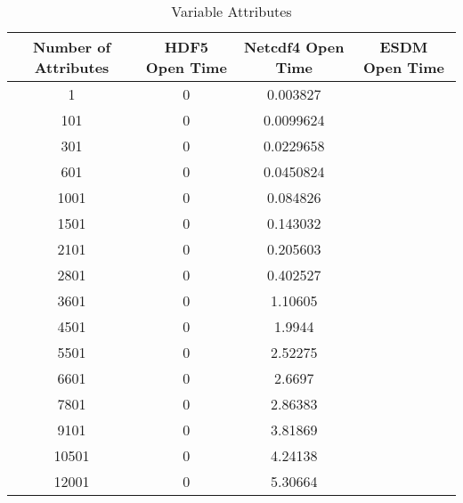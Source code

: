 \begin{table}[H]
\centering
\begin{tabular}{|c|c|c|c|}
\hline
Number of Attributes  & HDF5 Open Time & Netcdf4 Open Time & ESDM Open Time \\ \hline \hline
1 & 0 & 0.003827 & \\ \hline
101 & 0 & 0.0099624 & \\ \hline
301 & 0 & 0.0229658 & \\ \hline
601 & 0 & 0.0450824 & \\ \hline
1001 & 0 & 0.084826 & \\ \hline
1501 & 0 & 0.143032 & \\ \hline
2101 & 0 & 0.205603 & \\ \hline
2801 & 0 & 0.402527 & \\ \hline
3601 & 0 & 1.10605 & \\ \hline
4501 & 0 & 1.9944 & \\ \hline
5501 & 0 & 2.52275 & \\ \hline
6601 & 0 & 2.6697 & \\ \hline
7801 & 0 & 2.86383 & \\ \hline
9101 & 0 & 3.81869 & \\ \hline
10501 & 0 & 4.24138 & \\ \hline
12001 & 0 & 5.30664 & \\ \hline

\hline
\end{tabular}
\caption{\label{tab:global} Variable Attributes}
\end{table}
